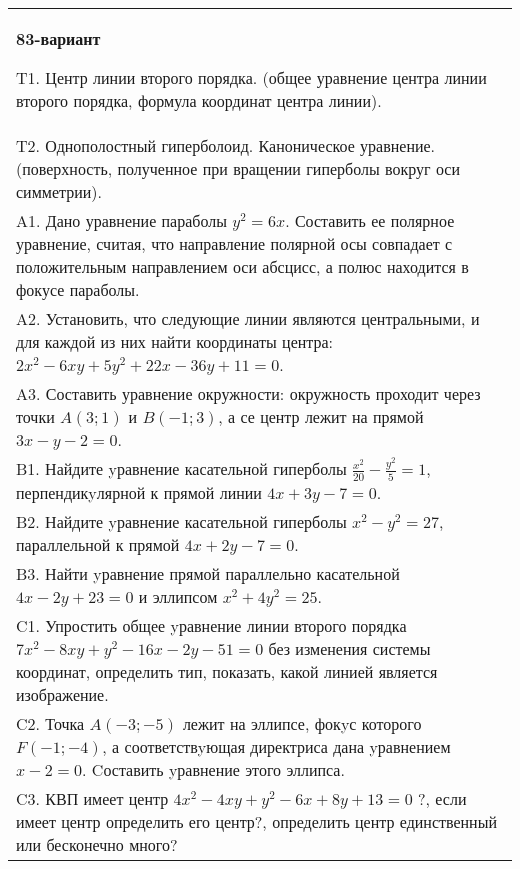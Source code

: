 \documentclass{article}
\begin{document}
\begin{tabular}{m{17cm}}
\textbf{83-вариант}
\newline

T1. Центр линии второго порядка. (общее уравнение центра линии второго порядка, формула координат центра линии).\\

T2. Однополостный гиперболоид. Каноническое уравнение. (поверхность, полученное при вращении гиперболы вокруг оси симметрии).\\

A1. Дано уравнение параболы $y^2=6x$. Составить ее полярное уравнение, считая, что направление полярной осы совпадает с положительным направлением оси абсцисс, а полюс находится в фокусе параболы.\\

A2. Установить, что следующие линии являются центральными, и для каждой из них найти координаты центра: $2x^{2}-6xy+5y^{2}+22x-36y+11=0$.\\

A3. Составить уравнение окружности: окружность проходит через точки $A(3;1)$ и $B(-1;3)$, а се центр лежит на прямой $3x-y-2=0$.\\

B1. Найдите yравнение касательной гиперболы $\frac{x^{2}}{20} - \frac{y^{2}}{5} = 1$, перпендикyлярной к прямой линии $4x + 3y - 7 = 0$.  \\

B2. Найдите yравнение касательной гиперболы $x^{2} - y^{2} = 27$, параллельной к прямой $4x + 2y - 7 = 0$.  \\

B3. Найти yравнение прямой параллельно касательной $4x - 2y + 23 = 0$ и эллипсом $x^{2} + 4y^{2} = 25$.  \\

C1. Упростить общее yравнение линии второго порядка $7x^{2}-8xy+y^{2}-16x-2y-51=0$ без изменения системы координат, определить тип, показать, какой линией является изображение.\\

C2. Точка $A(-3;-5)$ лежит на эллипсе, фокyс которого $F(-1;-4)$, а соответствyющая директриса дана yравнением $x-2=0$. Cоставить yравнение этого эллипса.  \\

C3. КВП имеет центр $4x^{2}-4xy+y^{2}-6x+8y+13=0$ ?, если имеет центр определить его центр?, определить центр единственный или бесконечно много?  \\

\end{tabular}
\vspace{1cm}
\end{document}
